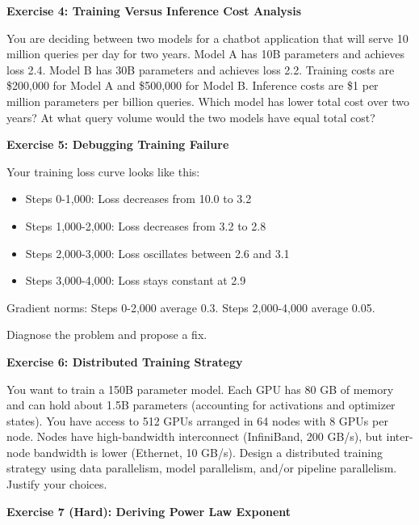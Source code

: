 \vspace{0.5em}

\textbf{Exercise 4: Training Versus Inference Cost Analysis}

You are deciding between two models for a chatbot application that will serve 10 million queries per day for two years. Model A has 10B parameters and achieves loss 2.4. Model B has 30B parameters and achieves loss 2.2. Training costs are \$200,000 for Model A and \$500,000 for Model B. Inference costs are \$1 per million parameters per billion queries. Which model has lower total cost over two years? At what query volume would the two models have equal total cost?

\vspace{0.5em}

\textbf{Exercise 5: Debugging Training Failure}

Your training loss curve looks like this:

\begin{itemize}
\item Steps 0-1,000: Loss decreases from 10.0 to 3.2
\item Steps 1,000-2,000: Loss decreases from 3.2 to 2.8
\item Steps 2,000-3,000: Loss oscillates between 2.6 and 3.1
\item Steps 3,000-4,000: Loss stays constant at 2.9
\end{itemize}

Gradient norms: Steps 0-2,000 average 0.3. Steps 2,000-4,000 average 0.05.

Diagnose the problem and propose a fix.

\vspace{0.5em}

\textbf{Exercise 6: Distributed Training Strategy}

You want to train a 150B parameter model. Each GPU has 80 GB of memory and can hold about 1.5B parameters (accounting for activations and optimizer states). You have access to 512 GPUs arranged in 64 nodes with 8 GPUs per node. Nodes have high-bandwidth interconnect (InfiniBand, 200 GB/s), but inter-node bandwidth is lower (Ethernet, 10 GB/s). Design a distributed training strategy using data parallelism, model parallelism, and/or pipeline parallelism. Justify your choices.

\vspace{0.5em}

\textbf{Exercise 7 (Hard): Deriving Power Law Exponent}

